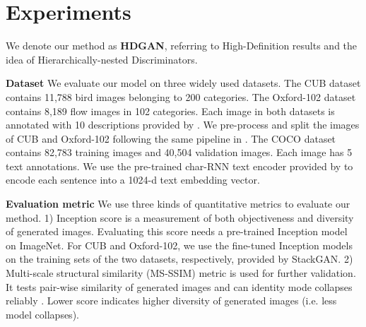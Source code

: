 \documentclass[10pt,twocolumn,letterpaper]{article}
\begin{document}
\section{Experiments}
We denote our method as \textbf{HDGAN}, referring to High-Definition results and the idea of Hierarchically-nested Discriminators.

\textbf{Dataset} 
We evaluate our model on three widely used datasets. The CUB dataset \cite{welinder2010caltech} contains 11,788 bird images belonging to 200 categories. 
The Oxford-102 dataset \cite{Nilsback08} contains 8,189 flow images in 102 categories. 
Each image in both datasets is annotated with 10 descriptions provided by \cite{reed2016generative}. We pre-process and split the images of CUB and Oxford-102 following the same pipeline in \cite{reed2016generative,han2017stackgan}. The COCO dataset \cite{lin2014microsoft} contains 82,783 training images and 40,504 validation images. Each image has 5 text annotations. 
We use the pre-trained char-RNN text encoder provided by \cite{reed2016generative} to encode each sentence into a 1024-d text embedding vector.

\textbf{Evaluation metric}
We use three kinds of quantitative metrics to evaluate our method.
1) Inception score \cite{improvedGAN} is a measurement of both objectiveness and diversity of generated images. Evaluating this score needs a pre-trained Inception model~\cite{inception} on ImageNet. For CUB and Oxford-102, we use the fine-tuned Inception models on the training sets of the two datasets, respectively, provided by StackGAN. 
2) Multi-scale structural similarity (MS-SSIM) metric \cite{improvedGAN} is used for further validation. It tests pair-wise similarity of generated images and can identity mode collapses reliably \cite{odena2016conditional}. Lower score indicates higher diversity of generated images (i.e. less model collapses). 
\end{document}
